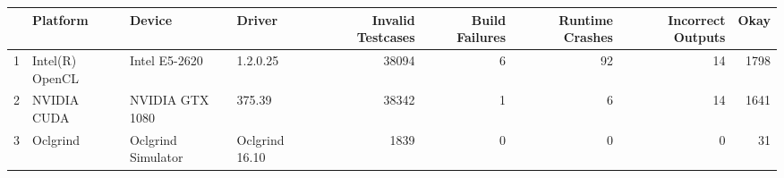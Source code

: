 \begin{tabular}{llllrrrrr}
\toprule
{} &         Platform &              Device &          Driver &  Invalid Testcases &  Build Failures &  Runtime Crashes &  Incorrect Outputs &  Okay \\
\midrule
1 &  Intel(R) OpenCL &       Intel E5-2620 &        1.2.0.25 &              38094 &               6 &               92 &                 14 &  1798 \\
2 &      NVIDIA CUDA &     NVIDIA GTX 1080 &          375.39 &              38342 &               1 &                6 &                 14 &  1641 \\
3 &         Oclgrind &  Oclgrind Simulator &  Oclgrind 16.10 &               1839 &               0 &                0 &                  0 &    31 \\
\bottomrule
\end{tabular}
